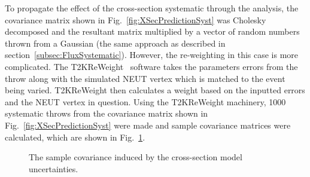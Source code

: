 \newline
\newline
To propagate the effect of the cross-section systematic through the analysis, the covariance matrix shown in Fig.~\ref{fig:XSecPredictionSyst} was Cholesky decomposed and the resultant matrix multiplied by a vector of random numbers thrown from a Gaussian (the same approach as described in section~\ref{subsec:FluxSystematic}).  However, the re-weighting in this case is more complicated.  The T2KReWeight~\cite{T2KReWeightTN} software takes the parameters errors from the throw along with the simulated NEUT vertex which is matched to the event being varied.  T2KReWeight then calculates a weight based on the inputted errors and the NEUT vertex in question.  Using the T2KReWeight machinery, 1000 systematic throws from the covariance matrix shown in Fig.~\ref{fig:XSecPredictionSyst} were made and sample covariance matrices were calculated, which are shown in Fig.~\ref{fig:XSecCovarianceMatrices}.
\begin{figure}[t!]
  \centering
  \caption{The sample covariance induced by the cross-section model uncertainties.}
  \label{fig:XSecCovarianceMatrices}
\end{figure}
\newline
